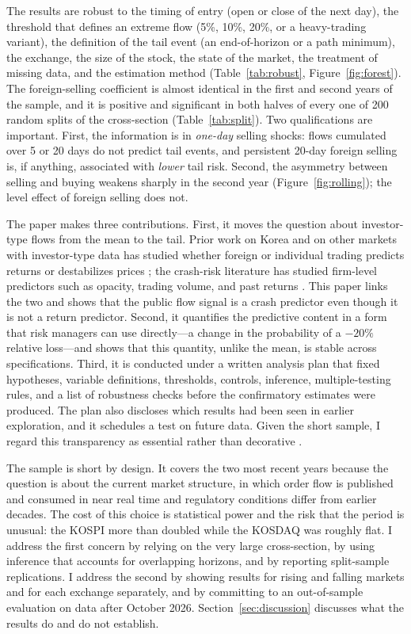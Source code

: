 \documentclass[11pt]{article}
\begin{document}
The results are robust to the timing of entry (open or close of the next day), the threshold that defines an extreme
flow (5\%, 10\%, 20\%, or a heavy-trading variant), the definition of the tail event (an end-of-horizon or a path
minimum), the exchange, the size of the stock, the state of the market, the treatment of missing data, and the
estimation method (Table~\ref{tab:robust}, Figure~\ref{fig:forest}). The foreign-selling coefficient is almost
identical in the first and second years of the sample, and it is positive and significant in both halves of every one
of 200 random splits of the cross-section (Table~\ref{tab:split}). Two qualifications are important. First, the
information is in \emph{one-day} selling shocks: flows cumulated over 5 or 20 days do not predict tail events, and
persistent 20-day foreign selling is, if anything, associated with \emph{lower} tail risk. Second, the asymmetry
between selling and buying weakens sharply in the second year (Figure~\ref{fig:rolling}); the level effect of foreign
selling does not.

The paper makes three contributions. First, it moves the question about investor-type flows from the mean to the tail.
Prior work on Korea and on other markets with investor-type data has studied whether foreign or individual trading
predicts returns or destabilizes prices \citep[e.g.,][]{choe1999,choe2005,richards2005,grinblatt2000,kaniel2008}; the
crash-risk literature has studied firm-level predictors such as opacity, trading volume, and past returns
\citep[e.g.,][]{chen2001,jin2006,hutton2009}. This paper links the two and shows that the public flow signal is a
crash predictor even though it is not a return predictor. Second, it quantifies the predictive content in a form that
risk managers can use directly---a change in the probability of a $-20\%$ relative loss---and shows that this
quantity, unlike the mean, is stable across specifications. Third, it is conducted under a written analysis plan that
fixed hypotheses, variable definitions, thresholds, controls, inference, multiple-testing rules, and a list of
robustness checks before the confirmatory estimates were produced. The plan also discloses which results had been seen
in earlier exploration, and it schedules a test on future data. Given the short sample, I regard this transparency as
essential rather than decorative \citep{harvey2016,nosek2018}.

The sample is short by design. It covers the two most recent years because the question is about the current market
structure, in which order flow is published and consumed in near real time and regulatory conditions differ from
earlier decades. The cost of this choice is statistical power and the risk that the period is unusual: the KOSPI more
than doubled while the KOSDAQ was roughly flat. I address the first concern by relying on the very large
cross-section, by using inference that accounts for overlapping horizons, and by reporting split-sample replications.
I address the second by showing results for rising and falling markets and for each exchange separately, and by
committing to an out-of-sample evaluation on data after October 2026. Section~\ref{sec:discussion} discusses what the
results do and do not establish.
\end{document}
